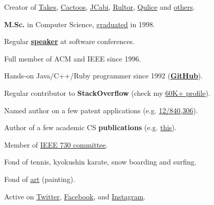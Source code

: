\documentclass[12pt]{article}
\begin{document}
Creator of \href{http://www.takes.org}{Takes},
  \href{http://www.cactoos.org}{Cactoos},
  \href{http://www.jcabi.com}{JCabi},
  \href{http://www.rultor.com}{Rultor},
  \href{http://www.qulice.com}{Qulice} and
  \href{http://www.yegor256.com/pets.html}{others}.

\textbf{M.Sc.} in Computer Science,
  \href{https://en.wikipedia.org/wiki/Oles_Honchar_Dnipro_National_University}{graduated} in 1998.

Regular \textbf{\href{http://www.yegor256.com/talks.html}{speaker}} at software conferences.

Full member of ACM and IEEE since 1996.

Hands-on Java/C++/Ruby programmer since 1992
  (\textbf{\href{https://github.com/yegor256}{GitHub}}).

Regular contributor to \textbf{StackOverflow}
  (check my \href{https://stackexchange.com/users/63162/yegor256}{60K+ profile}).

Named author on a few patent applications
  (e.g. \href{https://www.google.com/patents/US20120023476}{12/840,306}).

Author of a few academic CS \textbf{publications}
  (e.g. \href{link.springer.com/chapter/10.1007/978-3-642-02152-7_6}{this}).

Member of \href{http://standards.ieee.org/develop/wg/730.html}{IEEE 730 committee}.

Fond of tennis, kyokushin karate, snow boarding and surfing.

Fond of \href{http://www.yegor256.com/paintings.html}{art} (painting).

Active on
  \href{https://twitter.com/intent/follow?screen_name=yegor256}{Twitter},
  \href{https://www.facebook.com/yegor256}{Facebook},
  and \href{https://instagram.com/yegor256}{Instagram}.
\end{document}
